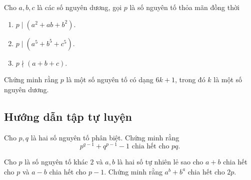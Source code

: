 \begin{btt}
Cho \(a,b,c\) là các số nguyên dương, gọi \(p\) là số nguyên tố thỏa mãn đồng thời
\begin{multicols}{3}
\begin{enumerate}[i,]
    \item \(p\mid \left(a^2+ab+b^2\right)\).
    \item \(p\mid \left(a^5+b^5+c^5\right)\).
    \item \(p\nmid \left(a+b+c\right)\).
\end{enumerate}
\end{multicols}
Chứng minh rằng \(p\) là một số nguyên tố có dạng \(6k+1\), trong đó \(k\) là một số nguyên dương.
\end{btt}

\subsection{Hướng dẫn tập tự luyện}

\begin{gbtt}
Cho $p, q$ là hai số nguyên tố phân biệt. Chứng minh rằng 
\[p^{q-1}+q^{p-1}-1\text{ chia hết cho }pq.\]
\end{gbtt}

\begin{gbtt}
Cho $p$ là số nguyên tố khác $2$ và $a, b$ là hai số tự nhiên lẻ sao cho $a+b$ chia hết cho $p$ và $a-b$ chia hết cho $p-1$. Chứng minh rằng $a^{b}+b^{a}$ chia hết cho $2p.$
\end{gbtt}

